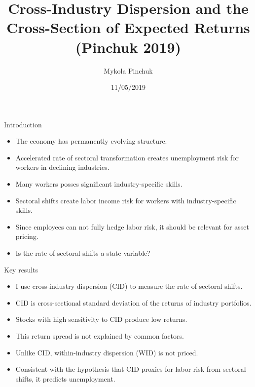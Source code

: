 \documentclass{beamer}
\title{Cross-Industry Dispersion and the Cross-Section of Expected Returns \\ (Pinchuk 2019)}
\author{Mykola Pinchuk}
\date{11/05/2019}
\begin{document}
\begin{frame}
  \titlepage
\end{frame}



\begin{frame}{Introduction}
\begin{itemize}
    \item {The economy has permanently evolving structure.}
    \item {Accelerated rate of sectoral transformation creates unemployment risk for workers in declining industries.}
    \item {Many workers posses significant industry-specific skills.}
    \item {Sectoral shifts create labor income risk for workers with industry-specific skills.}
    \item {Since employees can not fully hedge labor risk, it should be relevant for asset pricing.}
    \item {Is the rate of sectoral shifts a state variable?}
\end{itemize}

\end{frame}


\begin{frame}{Key results}
\begin{itemize}
    \item {I use cross-industry dispersion (CID) to measure the rate of sectoral shifts.}
    \item {CID is cross-sectional standard deviation of the returns of industry portfolios.}
    \item {Stocks with high sensitivity to CID produce low returns.}
    \item {This return spread is not explained by common factors.}
    \item {Unlike CID, within-industry dispersion (WID) is not priced.}
    \item {Consistent with the hypothesis that CID proxies for labor risk from sectoral shifts, it predicts unemployment.}
\end{itemize}
\end{frame}
\end{document}
